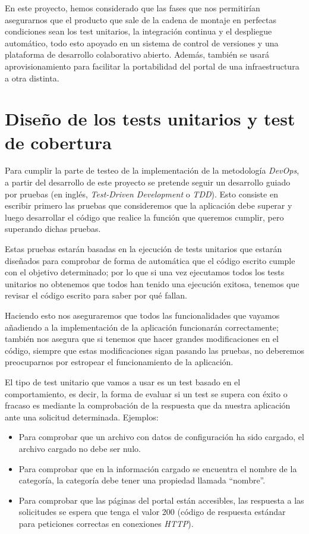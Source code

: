 \bigskip
En este proyecto, hemos considerado que las fases que nos permitirían asegurarnos que el producto que sale de la cadena de montaje en perfectas condiciones sean los test unitarios, la integración continua y el despliegue automático, todo esto apoyado en un sistema de control de versiones y una plataforma de desarrollo colaborativo abierto. Además, también se usará aprovisionamiento para facilitar la portabilidad del portal de una infraestructura a otra distinta. 

\section{Diseño de los tests unitarios y test de cobertura}

Para cumplir la parte de testeo de la implementación de la metodología \textit{DevOps}, a partir del desarrollo de este proyecto se pretende seguir un desarrollo guiado por pruebas (en inglés, \textit{Test-Driven Development} o \textit{TDD}). Esto consiste en escribir primero las pruebas que consideremos que la aplicación debe superar y luego desarrollar el código que realice la función que queremos cumplir, pero superando dichas pruebas. 

\bigskip
Estas pruebas estarán basadas en la ejecución de tests unitarios que estarán diseñados para comprobar de forma de automática que el código escrito cumple con el objetivo determinado; por lo que si una vez ejecutamos todos los tests unitarios no obtenemos que todos han tenido una ejecución exitosa, tenemos que revisar el código escrito para saber por qué fallan.

\bigskip
Haciendo esto nos aseguraremos que todos las funcionalidades que vayamos añadiendo a la implementación de la aplicación funcionarán correctamente; también nos asegura que si tenemos que hacer grandes modificaciones en el código, siempre que estas modificaciones sigan pasando las pruebas, no deberemos preocuparnos por estropear el funcionamiento de la aplicación.

\bigskip
El tipo de test unitario que vamos a usar es un test basado en el comportamiento, es decir, la forma de evaluar si un test se supera con éxito o fracaso es mediante la comprobación de la respuesta que da nuestra aplicación ante una solicitud 
determinada. Ejemplos:

\begin{itemize}
 \item Para comprobar que un archivo con datos de configuración ha sido cargado, el archivo cargado no debe ser nulo.
 \item Para comprobar que en la información cargado se encuentra el nombre de la categoría, la categoría debe tener una propiedad llamada ``nombre''.
 \item Para comprobar que las páginas del portal están accesibles, las respuesta a las solicitudes se espera que tenga el valor 200 (código de respuesta estándar para peticiones correctas en conexiones \textit{HTTP}).
\end{itemize}

